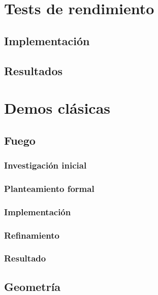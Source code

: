 
\chapter{Tests de rendimiento}

\section{Implementación}
\section{Resultados}

\chapter{Demos clásicas}

\section{Fuego}

\subsection{Investigación inicial}
\subsection{Planteamiento formal}
\subsection{Implementación}
\subsection{Refinamiento}
\subsection{Resultado}

\section{Geometría}

